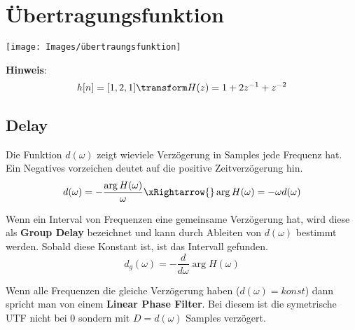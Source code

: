 \section{Übertragungsfunktion}
\begin{center}
	\texttt{[image: Images/übertraungsfunktion]}
\end{center}

\textbf{Hinweis}:
\[
h[n] = [1, 2, 1] \transform H(z) = 1 + 2z^{-1} + z^{-2}
\]

\subsection{Delay}
Die Funktion $d(\omega)$ zeigt wieviele Verzögerung in Samples jede Frequenz hat. Ein Negatives vorzeichen deutet auf die positive Zeitverzögerung hin.
\[
d(\omega) = -\frac{\arg H(\omega)}{\omega} \xRightarrow{} \arg H(\omega) = -\omega d(\omega)
\]

Wenn ein Interval von Frequenzen eine gemeinsame Verzögerung hat, wird diese als \textbf{Group Delay} bezeichnet und kann durch Ableiten von $d(\omega)$ bestimmt werden. Sobald diese Konstant ist, ist das Intervall gefunden.
\[
d_g(\omega) = - \frac{d}{d\omega}\arg H(\omega)
\]

Wenn alle Frequenzen die gleiche Verzögerung haben ($d(\omega) = konst$) dann spricht man von einem \textbf{Linear Phase Filter}. Bei diesem ist die symetrische UTF nicht bei 0 sondern mit $D = d(\omega)$ Samples verzögert.